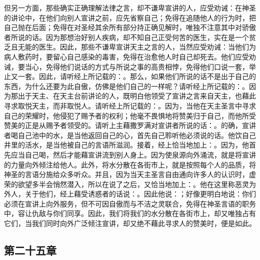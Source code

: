 但另一方面，那些确实正确理解法律之言，却不谦卑宣讲的人，应受劝诫：在神圣的讲论中，在他们向别人宣讲之前，应先省察自己；免得在追随他人的行为时，把自己抛在后面；免得在对圣经其余所有部分持正确见解时，唯独不注意其中对骄傲者所说的话。因为那想治好别人疾病，却不知自己正受何苦的医生，实在是一个贫乏且无能的医生。因此，那些不谦卑宣讲天主之言的人，当然应受劝诫：当他们为病人敷药时，要留心自己感染的毒害，免得在治愈他人时自己却死去。他们应受劝诫，要当心，免得他们说话的方式与所说之事的高贵相悖，免得他们口说一套，举止又一套。因此，请听经上所记载的：。那么，如果他们所说的话不是出于自己的东西，为什么还要为此自傲，仿佛是他们自己的一样呢？请听经上所记载的：。因为那出于天主、在天主台前讲论的人，既明白他领受了宣讲之言来自天主，也藉此寻求取悦天主，而非取悦人。请听经上所记载的：。因为，当他在天主圣言中寻求自己的荣耀时，他侵犯了赐予者的权利；他毫不畏惧地将赞美归于自己，而他所受赞美的正是从赐予者领受的。请听上主藉撒罗满对宣讲者所说的话：。的确，宣讲者喝自己池中的水，是当他返回自己的心，首先自己聆听他必须说的话。他饮自己井里的活水，是当他被自己的言语所滋润。接着，经上恰当地加上：。因为，他首先应当自己喝，然后才能藉宣讲流到别人身上。因为使泉源向外涌流，就是将宣讲的力量向外倾注给他人。此外，将水分散在各街市上，就是按照每个人的品质，将神圣的言语分施给众多听众。并且，因为当天主圣言自由通向许多人的认识时，虚荣的欲望多半会悄然潜入，所以在说了之后，又恰当地加上：。他在这里称恶灵为外人，关于他们，经上藉受诱惑者的话说：。因此他说：；好像更明白地说：你们必须在宣讲上向外服务，但不可因自傲而与不洁之灵联合，免得在神圣言语的职务中，容让仇敌与你们同享。因此，我们将我们的水分散在各街市上，却又唯独占有它们，当我们同时向外广泛倾注宣讲，却又绝不藉此寻求人的赞美时，便是如此。\par


\subsection{第二十五章}

